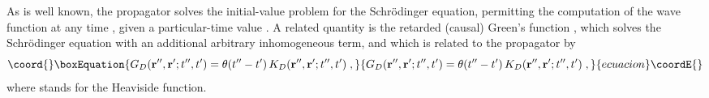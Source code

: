 \documentclass[a4paper,preprint,draft,showpacs,amsmath,amsfonts,amssymb,aps,prd]{revtex4}%
\begin{document}
As is well known, 
the propagator \coordHE{}
solves the initial-value problem for the 
Schr\"{o}dinger equation, permitting the computation of the wave function
\coordHE{} at any time \coordHE{}, given 
a particular-time value \coordHE{}.
A related quantity is the retarded (causal) Green's function
\coordHE{}, which solves the 
Schr\"{o}dinger equation with an additional arbitrary 
inhomogeneous term, and which is 
related to the propagator by
 \begin{equation}\coord{}\boxEquation{
G_{D}({\bf r}'', {\bf r}' ; t'',t') 
=
\theta (t''-t')
\,
K_{D}({\bf r}'', {\bf r}' ; t'',t') 
\;   ,
\label{eq:causal_Green}
}{
G_{D}({\bf r}'', {\bf r}' ; t'',t') 
=
\theta (t''-t')
\,
K_{D}({\bf r}'', {\bf r}' ; t'',t') 
\;   ,
}{ecuacion}\coordE{}\end{equation}
where
\coordHE{} stands for the Heaviside function.
\end{document}
